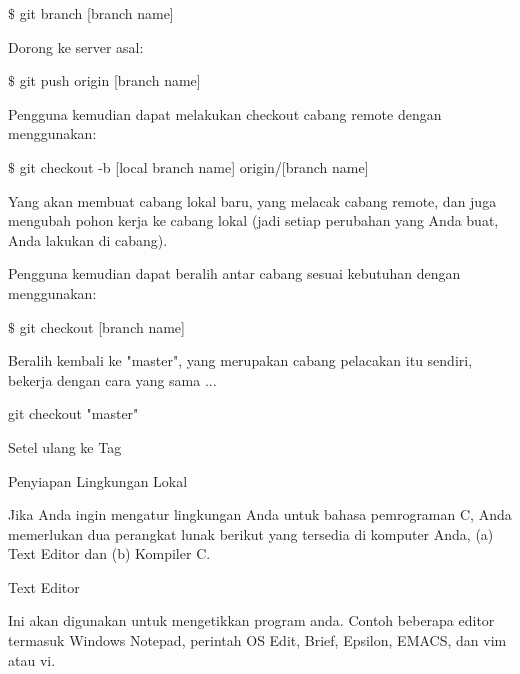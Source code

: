 \noindent 
  $  \$  $ git branch [branch name]  \par
\vspace{12pt}
\noindent 
Dorong ke server asal: \par
\vspace{12pt}
\noindent 
  $  \$  $ git push origin [branch name]  \par
\vspace{12pt}
\noindent 
Pengguna kemudian dapat melakukan checkout cabang remote dengan menggunakan: \par
\vspace{12pt}
\noindent 
  $  \$  $ git checkout -b [local branch name] origin/[branch name]  \par
\vspace{12pt}
\noindent 
Yang akan membuat cabang lokal baru, yang melacak cabang remote, dan juga mengubah pohon kerja ke cabang lokal (jadi setiap perubahan yang Anda buat, Anda lakukan di cabang). \par
\noindent 
Pengguna kemudian dapat beralih antar cabang sesuai kebutuhan dengan menggunakan: \par
\vspace{12pt}
\noindent 
  $  \$  $ git checkout [branch name]  \par
\vspace{12pt}
\noindent 
 $  $Beralih kembali ke "master", yang merupakan cabang pelacakan itu sendiri, bekerja dengan cara yang sama ... \par
\vspace{12pt}
\noindent 
 git checkout "master"  \par
\vspace{12pt}
\noindent 
 $  $Setel ulang ke Tag \par
\vspace{12pt}
\vspace{12pt}
\noindent 
Penyiapan Lingkungan Lokal \par
\vspace{12pt}
\noindent 
Jika Anda ingin mengatur lingkungan Anda untuk bahasa pemrograman C, Anda memerlukan dua perangkat lunak berikut yang tersedia di komputer Anda, (a) Text Editor dan (b) Kompiler C. \par
\vspace{12pt}
\noindent 
Text Editor \par
\vspace{12pt}
\noindent 
Ini akan digunakan untuk mengetikkan program anda. Contoh beberapa editor termasuk Windows Notepad, perintah OS Edit, Brief, Epsilon, EMACS, dan vim atau vi. \par
